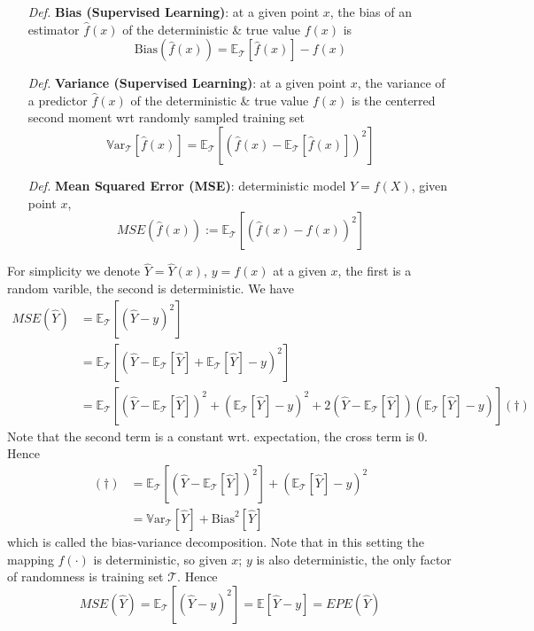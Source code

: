\documentclass[a4paper, 11pt]{article}
\begin{document}
\begin{itemize}
	\item[\textit{Def.}] \textbf{Bias (Supervised Learning)}: at a given point $x$, the bias of an estimator $\hat{f}(x)$ of the deterministic \& true value $f(x)$ is
	$$
	\text{Bias}(\hat{f}(x))=\mathbb{E}_{\mathcal{T}}\left[\hat{f}(x)\right] - f(x)
	$$

	\item[\textit{Def.}] \textbf{Variance (Supervised Learning)}: at a given point $x$, the variance of a predictor $\hat{f}(x)$ of the  deterministic \& true value $f(x)$ is the centerred second moment wrt randomly sampled training set
	$$
	\mathrm{\mathbb{V}ar}_{\mathcal{T}}\left[\hat{f}(x)\right] = \mathbb{E}_{\mathcal{T}}\left[\left(\hat{f}(x)-\mathbb{E}_{\mathcal{T}}\left[\hat{f}(x)\right]\right)^2\right]
	$$

	\item[\textit{Def.}] \textbf{Mean Squared Error (MSE)}: deterministic model $Y = f(X)$, given point $x$,
	$$
	MSE(\hat{f}(x)) := \mathbb{E}_{\mathcal{T}}\left[\left(\hat{f}(x) - f(x)\right)^2\right]
	$$
\end{itemize}
For simplicity we denote $\hat{Y}=\hat{Y}(x)$, $y=f(x)$ at a given $x$, the first is a random varible, the second is deterministic. We have
\begin{equation}
	\begin{split}
		MSE(\hat{Y}) &= \mathbb{E}_{\mathcal{T}}\left[\left(\hat{Y} - y\right)^2\right] \\
		& = \mathbb{E}_{\mathcal{T}}\left[\left(\hat{Y} - \mathbb{E}_{\mathcal{T}}[\hat{Y}] + \mathbb{E}_{\mathcal{T}}[\hat{Y}] - y\right)^2\right] \\
		& = \mathbb{E}_{\mathcal{T}}\left[\left(\hat{Y} - \mathbb{E}_{\mathcal{T}}[\hat{Y}]\right)^2 + \left(\mathbb{E}_{\mathcal{T}}[\hat{Y}] - y\right)^2 + 2(\hat{Y} - \mathbb{E}_{\mathcal{T}}[\hat{Y}])(\mathbb{E}_{\mathcal{T}}[\hat{Y}] - y)\right] (\dag)
	\end{split}
\end{equation}
Note that the second term is a constant wrt. expectation, the cross term is 0. Hence 
\begin{equation}
	\begin{split}
		(\dag) &= \mathbb{E}_{\mathcal{T}}\left[\left(\hat{Y} - \mathbb{E}_{\mathcal{T}}[\hat{Y}]\right)^2\right] + \left(\mathbb{E}_{\mathcal{T}}[\hat{Y}] - y\right)^2 \\
		&= \mathrm{\mathbb{V}ar}_{\mathcal{T}}[\hat{Y}] + \text{Bias}^2[\hat{Y}]
	\end{split}
\end{equation}
which is called the bias-variance decomposition. Note that in this setting the mapping $f(\cdot)$ is deterministic, so given $x$; $y$ is also deterministic, the only factor of randomness is training set $\mathcal{T}$. Hence
$$
MSE(\hat{Y}) = \mathbb{E}_{\mathcal{T}}\left[\left(\hat{Y} - y\right)^2\right] = \mathbb{E}\left[\hat{Y} - y\right] = EPE(\hat{Y})
$$ 
\end{document}

